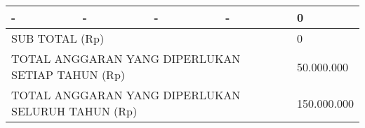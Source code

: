 \begin{table}[H]
{\begin{tabular}{|lllll|}
			\multicolumn{1}{|l|}{-}                                                                                      & \multicolumn{1}{l|}{-}                                                                                                                                  & \multicolumn{1}{l|}{-}                                                             & \multicolumn{1}{l|}{-}                                                               & 0                                                                                                 \\ \hline
			\multicolumn{4}{|l|}{SUB TOTAL (Rp)}                                                                                                                                                                                                                                                                                                                                                                                                               & 0                                                                                                 \\ \hline
			\multicolumn{4}{|l|}{TOTAL ANGGARAN YANG DIPERLUKAN SETIAP TAHUN (Rp)}                                                                                                                                                                                                                                                                                                                                                                             & 50.000.000                                                                                        \\ \hline
			\multicolumn{4}{|l|}{TOTAL ANGGARAN YANG DIPERLUKAN SELURUH TAHUN (Rp)}                                                                                                                                                                                                                                                                                                                                                                            & 150.000.000                                                                                       \\ \hline
		\end{tabular}%
	}
\end{table}